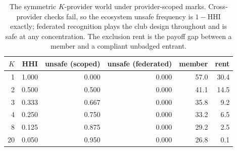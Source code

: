 \begin{table}[t]
\centering
\caption{The symmetric $K$-provider world under provider-scoped
marks.  Cross-provider checks fail, so the ecosystem unsafe
frequency is $1 - \mathrm{HHI}$ exactly; federated recognition
plays the club design throughout and is safe at any concentration.
The exclusion rent is the payoff gap between a member and a
compliant unbadged entrant.}
\label{tab:providers}
\small
\begin{tabular}{rrrrrr}
\toprule
$K$ & HHI & unsafe (scoped) & unsafe (federated) & member & rent \\
\midrule
1 & 1.000 & 0.000 & 0.000 & 57.0 & 30.4 \\
2 & 0.500 & 0.500 & 0.000 & 41.1 & 14.5 \\
3 & 0.333 & 0.667 & 0.000 & 35.8 & 9.2 \\
4 & 0.250 & 0.750 & 0.000 & 33.2 & 6.5 \\
8 & 0.125 & 0.875 & 0.000 & 29.2 & 2.5 \\
20 & 0.050 & 0.950 & 0.000 & 26.8 & 0.1 \\
\bottomrule
\end{tabular}
\end{table}
